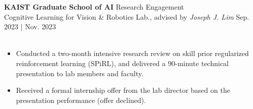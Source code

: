 \documentclass[a4paper,10pt]{extarticle}
\begin{document}
\vspace*{0.12cm}
\noindent\textbf{KAIST Graduate School of AI} \hfill Research Engagement\\
Cognitive Learning for Vision \& Robotics Lab., advised by \textsl{Joseph J. Lim} \hfill Sep. 2023 | Nov. 2023\\
\vspace*{-0.25cm}\\
\begin{minipage}{0.77\textwidth}
	\small
	\begin{itemize}
		\item Conducted a two-month intensive research review on skill prior regularized reinforcement learning (SPiRL), and delivered a 90-minute technical presentation to lab members and faculty.
		\item Received a formal internship offer from the lab director based on the presentation performance (offer declined).
	\end{itemize}
\end{minipage}\\
\end{document}
